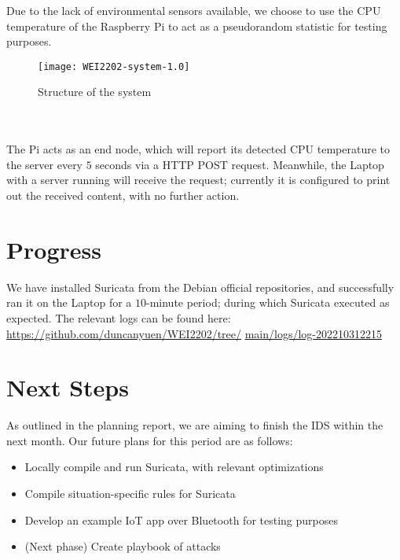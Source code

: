 \documentclass{article}
\begin{document}
\begin{multicols}{2}
Due to the lack of environmental sensors available, we choose to use the CPU temperature of the Raspberry Pi to act as a pseudorandom statistic for testing purposes.\\
\begin{minipage}{0.4\textwidth}\begin{figure}[H]\texttt{[image: WEI2202-system-1.0]}
\caption{Structure of the system}
\end{figure}\end{minipage}\\\\
The Pi acts as an end node, which will report its detected CPU temperature to the server every \(5\) seconds via a HTTP POST request. Meanwhile, the Laptop with a server running will receive the request; currently it is configured to print out the received content, with no further action.
\section{Progress}
We have installed Suricata from the Debian official repositories, and successfully ran it on the Laptop for a \(10\)-minute period; during which Suricata executed as expected. The relevant logs can be found here: \href{https://github.com/duncanyuen/WEI2202/tree/main/logs/log-202210312215}{\underline{https://github.com/duncanyuen/WEI2202/tree/}} \href{https://github.com/duncanyuen/WEI2202/tree/main/logs/log-202210312215}{\underline{main/logs/log-202210312215}}
\section{Next Steps}
As outlined in the planning report, we are aiming to finish the IDS within the next month. Our future plans for this period are as follows:
\begin{itemize}
\item[1.]{
Locally compile and run Suricata, with relevant optimizations
}
\item[2.]{
Compile situation-specific rules for Suricata
}
\item[3.]{
Develop an example IoT app over Bluetooth for testing purposes
}
\item[4.]{
(Next phase) Create playbook of attacks
}
\end{itemize}
\end{multicols}



\end{document}
